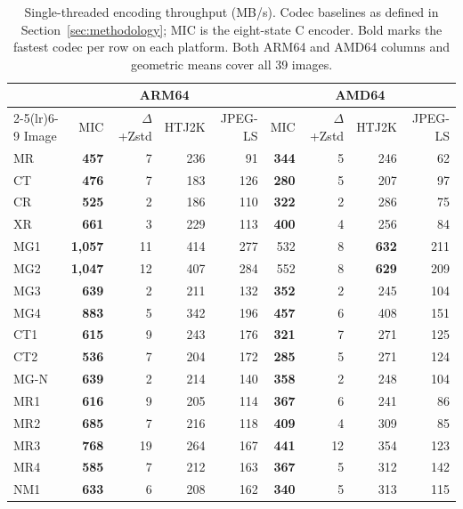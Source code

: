 \documentclass[journal]{IEEEtran}
\begin{document}
\begin{table}[htbp]
\centering
\caption{Single-threaded encoding throughput (MB/s). Codec
baselines as defined in Section~\ref{sec:methodology}; MIC is the
eight-state C encoder. Bold marks the fastest codec per row on each
platform. Both ARM64 and AMD64 columns and geometric means cover all 39
images.}
\label{tab:enc}
\scriptsize
\begin{tabular}{l|rrrr|rrrr}
\toprule
 & \multicolumn{4}{c|}{ARM64} & \multicolumn{4}{c}{AMD64} \\
\cmidrule(lr){2-5}\cmidrule(lr){6-9}
Image & MIC & $\Delta$+Zstd & HTJ2K & JPEG-LS & MIC & $\Delta$+Zstd & HTJ2K & JPEG-LS \\
\midrule
MR             & \textbf{457} & 7 & 236 & 91 & \textbf{344} & 5 & 246 & 62 \\
CT             & \textbf{476} & 7 & 183 & 126 & \textbf{280} & 5 & 207 & 97 \\
CR             & \textbf{525} & 2 & 186 & 110 & \textbf{322} & 2 & 286 & 75 \\
XR             & \textbf{661} & 3 & 229 & 113 & \textbf{400} & 4 & 256 & 84 \\
MG1            & \textbf{1{,}057} & 11 & 414 & 277 & 532 & 8 & \textbf{632} & 211 \\
MG2            & \textbf{1{,}047} & 12 & 407 & 284 & 552 & 8 & \textbf{629} & 209 \\
MG3            & \textbf{639} & 2 & 211 & 132 & \textbf{352} & 2 & 245 & 104 \\
MG4            & \textbf{883} & 5 & 342 & 196 & \textbf{457} & 6 & 408 & 151 \\
CT1            & \textbf{615} & 9 & 243 & 176 & \textbf{321} & 7 & 271 & 125 \\
CT2            & \textbf{536} & 7 & 204 & 172 & \textbf{285} & 5 & 271 & 124 \\
MG-N           & \textbf{639} & 2 & 214 & 140 & \textbf{358} & 2 & 248 & 104 \\
MR1            & \textbf{616} & 9 & 205 & 114 & \textbf{367} & 6 & 241 & 86 \\
MR2            & \textbf{685} & 7 & 216 & 118 & \textbf{409} & 4 & 309 & 85 \\
MR3            & \textbf{768} & 19 & 264 & 167 & \textbf{441} & 12 & 354 & 123 \\
MR4            & \textbf{585} & 7 & 212 & 163 & \textbf{367} & 5 & 312 & 142 \\
NM1            & \textbf{633} & 6 & 208 & 162 & \textbf{340} & 5 & 313 & 115 \\

\end{tabular}
\end{table}
\end{document}

